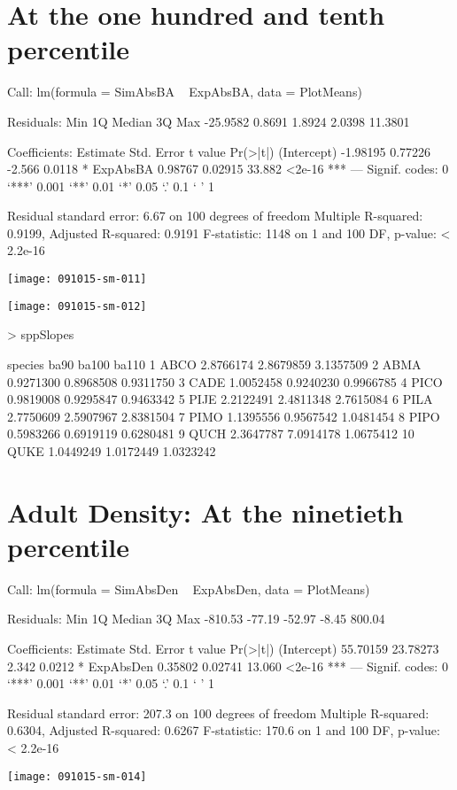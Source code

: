 \documentclass{article}
\begin{document}
\newpage
\section{At the one hundred and tenth percentile}
\begin{Schunk}
\begin{Soutput}
Call:
lm(formula = SimAbsBA ~ ExpAbsBA, data = PlotMeans)

Residuals:
     Min       1Q   Median       3Q      Max 
-25.9582   0.8691   1.8924   2.0398  11.3801 

Coefficients:
            Estimate Std. Error t value Pr(>|t|)    
(Intercept) -1.98195    0.77226  -2.566   0.0118 *  
ExpAbsBA     0.98767    0.02915  33.882   <2e-16 ***
---
Signif. codes:  0 ‘***’ 0.001 ‘**’ 0.01 ‘*’ 0.05 ‘.’ 0.1 ‘ ’ 1

Residual standard error: 6.67 on 100 degrees of freedom
Multiple R-squared:  0.9199,	Adjusted R-squared:  0.9191 
F-statistic:  1148 on 1 and 100 DF,  p-value: < 2.2e-16
\end{Soutput}
\end{Schunk}
\texttt{[image: 091015-sm-011]}

\texttt{[image: 091015-sm-012]}
\begin{Schunk}
\begin{Sinput}
>   sppSlopes
\end{Sinput}
\begin{Soutput}
   species      ba90     ba100     ba110
1     ABCO 2.8766174 2.8679859 3.1357509
2     ABMA 0.9271300 0.8968508 0.9311750
3     CADE 1.0052458 0.9240230 0.9966785
4     PICO 0.9819008 0.9295847 0.9463342
5     PIJE 2.2122491 2.4811348 2.7615084
6     PILA 2.7750609 2.5907967 2.8381504
7     PIMO 1.1395556 0.9567542 1.0481454
8     PIPO 0.5983266 0.6919119 0.6280481
9     QUCH 2.3647787 7.0914178 1.0675412
10    QUKE 1.0449249 1.0172449 1.0323242
\end{Soutput}
\end{Schunk}






\newpage

\section{Adult Density: At the ninetieth percentile}
\begin{Schunk}
\begin{Soutput}
Call:
lm(formula = SimAbsDen ~ ExpAbsDen, data = PlotMeans)

Residuals:
    Min      1Q  Median      3Q     Max 
-810.53  -77.19  -52.97   -8.45  800.04 

Coefficients:
            Estimate Std. Error t value Pr(>|t|)    
(Intercept) 55.70159   23.78273   2.342   0.0212 *  
ExpAbsDen    0.35802    0.02741  13.060   <2e-16 ***
---
Signif. codes:  0 ‘***’ 0.001 ‘**’ 0.01 ‘*’ 0.05 ‘.’ 0.1 ‘ ’ 1

Residual standard error: 207.3 on 100 degrees of freedom
Multiple R-squared:  0.6304,	Adjusted R-squared:  0.6267 
F-statistic: 170.6 on 1 and 100 DF,  p-value: < 2.2e-16
\end{Soutput}
\end{Schunk}
\texttt{[image: 091015-sm-014]}
\end{document}
